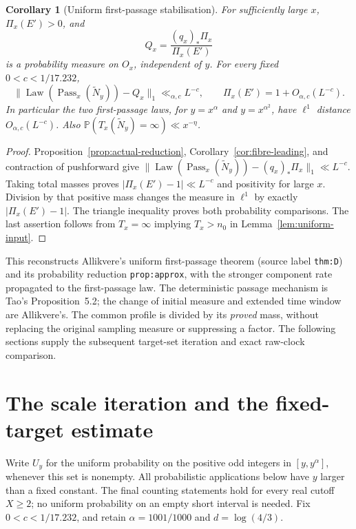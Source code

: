 \documentclass[11pt]{article}
\newtheorem{corollary}[proposition]{Corollary}
\theoremstyle{remark}\newtheorem{remark}[proposition]{Remark}
\newcommand{\PP}{\mathbb P}
\begin{document}
\begin{corollary}[Uniform first-passage stabilisation]
\label{cor:uniform-stabilisation}
For sufficiently large $x$, $\Pi_x(E')>0$, and
\[
 Q_x=\frac{(q_x)_*\Pi_x}{\Pi_x(E')}
\]
is a probability measure on $O_x$, independent of $y$. For every fixed
$0<c<1/17.232$,
\[
 \|\operatorname{Law}(\operatorname{Pass}_x(\widetilde N_y))-Q_x\|_1
       \ll_{\alpha,c}L^{-c},\qquad
 \Pi_x(E')=1+O_{\alpha,c}(L^{-c}).
\]
In particular the two first-passage laws, for $y=x^\alpha$ and
$y=x^{\alpha^2}$, have $\ell^1$ distance $O_{\alpha,c}(L^{-c})$.
Also $\PP(T_x(\widetilde N_y)=\infty)\ll x^{-\eta}$.
\end{corollary}
\begin{proof}
Proposition~\ref{prop:actual-reduction}, Corollary~\ref{cor:fibre-leading},
and contraction of pushforward give
$\|\operatorname{Law}(\operatorname{Pass}_x(\widetilde N_y))
       -(q_x)_*\Pi_x\|_1\ll L^{-c}$.
Taking total masses proves $|\Pi_x(E')-1|\ll L^{-c}$ and positivity
for large $x$. Division by that positive mass changes the measure
in $\ell^1$ by exactly $|\Pi_x(E')-1|$. The triangle inequality
proves both probability comparisons. The last assertion follows
from $T_x=\infty$ implying $T_x>n_0$ in Lemma~\ref{lem:uniform-input}.
\end{proof}

This reconstructs Allikvere's uniform first-passage theorem (source label
\texttt{thm:D}) and its probability reduction
\texttt{prop:approx}, with the stronger component rate propagated to
the first-passage law. The deterministic passage mechanism is Tao's
Proposition~5.2; the change of initial measure and extended time
window are Allikvere's. The common profile is divided by its
\emph{proved} mass, without replacing the original sampling measure
or suppressing a factor. The following sections supply the subsequent
target-set iteration and exact raw-clock comparison.

\section{The scale iteration and the fixed-target estimate}

Write $U_y$ for the uniform probability on the positive odd integers
in $[y,y^\alpha]$, whenever this set is nonempty. All probabilistic
applications below have $y$ larger than a fixed constant. The final
counting statements hold for every real cutoff $X\ge2$; no uniform
probability on an empty short interval is needed. Fix
$0<c<1/17.232$, and retain $\alpha=1001/1000$ and $d=\log(4/3)$.
\end{document}
